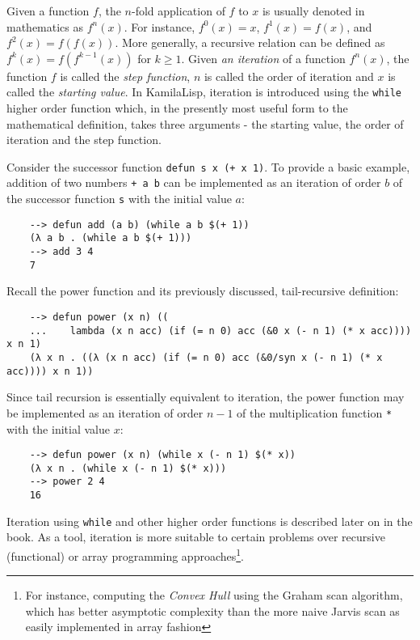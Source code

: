 Given a function $f$, the $n$-fold application of $f$ to $x$ is usually denoted in mathematics as $f^n(x)$. For instance, $f^0(x) = x$, $f^1(x) = f(x)$, and $f^2(x) = f(f(x))$. More generally, a recursive relation can be defined as $f^k(x) = f(f^{k-1}(x))$ for $k \ge 1$. Given \textit{an iteration} of a function $f^n(x)$, the function $f$ is called the \textit{step function}, $n$ is called the order of iteration and $x$ is called the \textit{starting value}. In KamilaLisp, iteration is introduced using the \verb|while| higher order function which, in the presently most useful form to the mathematical definition, takes three arguments - the starting value, the order of iteration and the step function.

Consider the successor function \verb|defun s x (+ x 1)|. To provide a basic example, addition of two numbers \verb|+ a b| can be implemented as an iteration of order $b$ of the successor function \verb|s| with the initial value $a$:

\begin{Verbatim}
    --> defun add (a b) (while a b $(+ 1))
    (λ a b . (while a b $(+ 1)))
    --> add 3 4
    7
\end{Verbatim}

Recall the power function and its previously discussed, tail-recursive definition:

\begin{Verbatim}
    --> defun power (x n) ((
    ...    lambda (x n acc) (if (= n 0) acc (&0 x (- n 1) (* x acc)))) x n 1)
    (λ x n . ((λ (x n acc) (if (= n 0) acc (&0/syn x (- n 1) (* x acc)))) x n 1))
\end{Verbatim}

Since tail recursion is essentially equivalent to iteration, the power function may be implemented as an iteration of order $n-1$ of the multiplication function \verb|*| with the initial value $x$:

\begin{Verbatim}
    --> defun power (x n) (while x (- n 1) $(* x))
    (λ x n . (while x (- n 1) $(* x)))
    --> power 2 4
    16
\end{Verbatim}

Iteration using \verb|while| and other higher order functions is described later on in the book. As a tool, iteration is more suitable to certain problems over recursive (functional) or array programming approaches\footnote{For instance, computing the \textit{Convex Hull} using the Graham scan algorithm, which has better asymptotic complexity than the more naive Jarvis scan as easily implemented in array fashion}.

